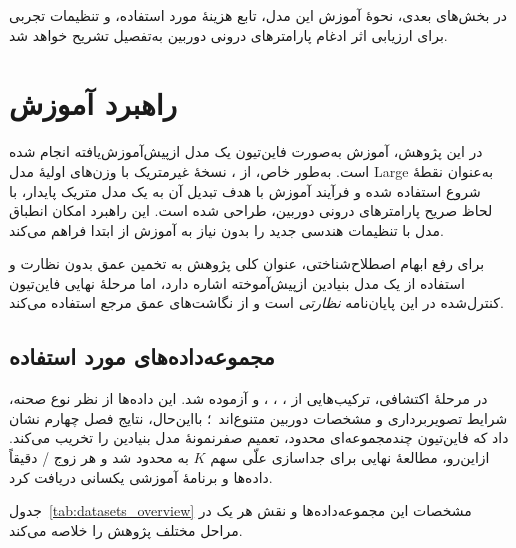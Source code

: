 در بخش‌های بعدی، نحوهٔ آموزش این مدل، تابع هزینهٔ مورد استفاده، و تنظیمات تجربی برای ارزیابی اثر ادغام پارامترهای درونی دوربین به‌تفصیل تشریح خواهد شد.

 \section{راهبرد آموزش \proposedmodel{}}

در این پژوهش، آموزش \proposedmodel{} به‌صورت فاین‌تیون یک مدل ازپیش‌آموزش‌یافته انجام شده است. به‌طور خاص، از \basemodel{}، نسخهٔ غیرمتریک با وزن‌های اولیهٔ مدل Large به‌عنوان نقطهٔ شروع استفاده شده و فرآیند آموزش با هدف تبدیل آن به یک مدل متریک پایدار، با لحاظ صریح پارامترهای درونی دوربین، طراحی شده است. این راهبرد امکان انطباق مدل با تنظیمات هندسی جدید را بدون نیاز به آموزش از ابتدا فراهم می‌کند.

برای رفع ابهام اصطلاح‌شناختی، عنوان کلی پژوهش به تخمین عمق بدون نظارت و استفاده از یک مدل بنیادین ازپیش‌آموخته اشاره دارد، اما مرحلهٔ نهایی فاین‌تیون کنترل‌شده در این پایان‌نامه \emph{نظارتی} است و از نگاشت‌های عمق مرجع  استفاده می‌کند.

\subsection{مجموعه‌داده‌های مورد استفاده}

در مرحلهٔ اکتشافی، ترکیب‌هایی از ، ، ،  و  آزموده شد. این داده‌ها از نظر نوع صحنه، شرایط تصویربرداری و مشخصات دوربین متنوع‌اند~\cite{Gaidon2016VKITTI,Silberman2012NYUv2,Vasiljevic2019DIODE,Cordts2016Cityscapes,Scharstein2014Middlebury}؛ بااین‌حال، نتایج فصل چهارم نشان داد که فاین‌تیون چندمجموعه‌ای محدود، تعمیم صفرنمونهٔ مدل بنیادین را تخریب می‌کند. ازاین‌رو، مطالعهٔ نهایی برای جداسازی علّی سهم $K$ به  محدود شد و هر زوج \proposedmodel{}/\controlmodel{} دقیقاً داده‌ها و برنامهٔ آموزشی یکسانی دریافت کرد.

جدول~\ref{tab:datasets_overview} مشخصات این مجموعه‌داده‌ها و نقش هر یک در
مراحل مختلف پژوهش را خلاصه می‌کند.

